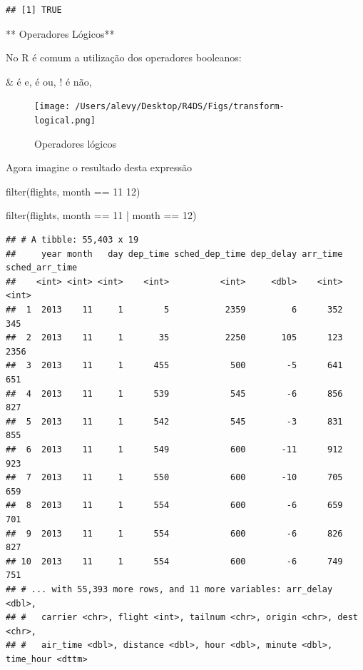 \documentclass[
]{article}
\newenvironment{Shaded}{\begin{snugshade}}{\end{snugshade}}
\newcommand{\DecValTok}[1]{\textcolor[rgb]{0.00,0.00,0.81}{#1}}
\newcommand{\FunctionTok}[1]{\textcolor[rgb]{0.00,0.00,0.00}{#1}}
\newcommand{\NormalTok}[1]{#1}
\newcommand{\SpecialCharTok}[1]{\textcolor[rgb]{0.00,0.00,0.00}{#1}}
\begin{document}
\begin{verbatim}
## [1] TRUE
\end{verbatim}

** Operadores Lógicos**

No R é comum a utilização dos operadores booleanos:

\& é e, \textbar{} é ou, ! é não,

\begin{figure}
\centering
\texttt{[image: /Users/alevy/Desktop/R4DS/Figs/transform-logical.png]}
\caption{Operadores lógicos}
\end{figure}

Agora imagine o resultado desta expressão

filter(flights, month == 11 \textbar{} 12)

\begin{Shaded}
\begin{Highlighting}[]
\FunctionTok{filter}\NormalTok{(flights, month }\SpecialCharTok{==} \DecValTok{11} \SpecialCharTok{|}\NormalTok{ month }\SpecialCharTok{==} \DecValTok{12}\NormalTok{)}
\end{Highlighting}
\end{Shaded}

\begin{verbatim}
## # A tibble: 55,403 x 19
##     year month   day dep_time sched_dep_time dep_delay arr_time sched_arr_time
##    <int> <int> <int>    <int>          <int>     <dbl>    <int>          <int>
##  1  2013    11     1        5           2359         6      352            345
##  2  2013    11     1       35           2250       105      123           2356
##  3  2013    11     1      455            500        -5      641            651
##  4  2013    11     1      539            545        -6      856            827
##  5  2013    11     1      542            545        -3      831            855
##  6  2013    11     1      549            600       -11      912            923
##  7  2013    11     1      550            600       -10      705            659
##  8  2013    11     1      554            600        -6      659            701
##  9  2013    11     1      554            600        -6      826            827
## 10  2013    11     1      554            600        -6      749            751
## # ... with 55,393 more rows, and 11 more variables: arr_delay <dbl>,
## #   carrier <chr>, flight <int>, tailnum <chr>, origin <chr>, dest <chr>,
## #   air_time <dbl>, distance <dbl>, hour <dbl>, minute <dbl>, time_hour <dttm>
\end{verbatim}
\end{document}
